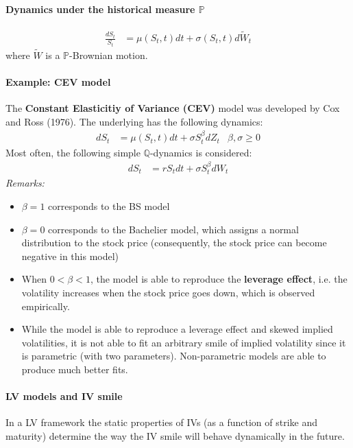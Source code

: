 \documentclass[a4paper,landscape,7pt,fleqn]{scrartcl}
\renewcommand{\emph}[1]{\textbf{#1}}
\begin{document}
\begin{multicols*}{3}
\paragraph{Dynamics under the historical measure $\mathbb{P}$}
\begin{align*}
\frac{dS_t}{S_t} &= \mu(S_t,t) dt + \sigma (S_t,t) d \tilde W_t
\end{align*}
where $\tilde W$ is a $\mathbb{P}$-Brownian motion.

\paragraph{Example: CEV model}

The \emph{Constant Elasticitiy of Variance (CEV)} model was developed by Cox and Ross (1976). The underlying has the following dynamics:
\begin{align*}
dS_t &= \mu (S_t,t) dt + \sigma S_t^\beta dZ_t & \beta, \sigma \geq 0
\end{align*}
Most often, the following simple $\mathbb{Q}$-dynamics is considered:
\begin{align*}
dS_t &= r S_t dt + \sigma S_t^\beta dW_t
\end{align*}
\textit{Remarks:}
\begin{itemize}
\item $\beta = 1$ corresponds to the BS model
\item $\beta = 0$ corresponds to the Bachelier model, which assigns a normal distribution to the stock price (consequently, the stock price can become negative in this model)
\item When $0 < \beta < 1$, the model is able to reproduce the \emph{leverage effect}, i.e. the volatility increases when the stock price goes down, which is observed empirically.
\item While the model is able to reproduce a leverage effect and skewed implied volatilities, it is not able to fit an arbitrary smile of implied volatility since it is parametric (with two parameters). Non-parametric models are able to produce much better fits.
\end{itemize}

\paragraph{LV models and IV smile}
In a LV framework the static properties of IVs (as a function of strike and maturity) determine the way the IV smile will behave dynamically in the future.


\end{multicols*}
\end{document}

